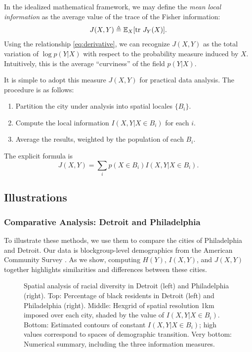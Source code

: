 \documentclass[english]{scrartcl}
\begin{document}
		In the idealized mathematical framework, we may define the \emph{mean local information} as the average value of the trace of the Fisher information: 
		\begin{equation}
			J(X,Y) \triangleq \mathbb{E}_X[\text{tr } J_Y(X)].
		\end{equation}
		Using the relationship \eqref{eq:derivative}, we can recognize $J(X,Y)$ as the total variation of $\log p(Y|X)$ with respect to the probability measure induced by $X$. Intuitively, this is the average ``curviness'' of the field $p(Y|X)$. 

		It is simple to adopt this measure $J(X,Y)$ for practical data analysis. The procedure is as follows: 
		\begin{enumerate}
		 	\item Partition the city under analysis into spatial locales $\{B_i\}$.
		 	\item Compute the local information $I(X,Y|X \in B_i)$ for each $i$. 
		 	\item Average the results, weighted by the population of each $B_i$. 
		\end{enumerate} 
		The explicit formula is 
		\begin{equation}
			J(X,Y) = \sum_i p(X \in B_i) I(X,Y|X \in B_i). \label{eq:formula}
		\end{equation}

	\subsection{Illustrations}
		\subsubsection{Comparative Analysis: Detroit and Philadelphia}
			To illustrate these methods, we use them to compare the cities of Philadelphia and Detroit. Our data is blockgroup-level demographics from the American Community Survey \cite{CensusRace}. As we show, computing $H(Y)$, $I(X,Y)$, and $J(X,Y)$ together highlights similarities and differences between these cities. 
			\begin{figure}
				\caption{Spatial analysis of racial diversity in Detroit (left) and Philadelphia (right). Top: Percentage of black residents in Detroit (left) and Philadelphia (right). Middle: Hexgrid of spatial resolution 1km imposed over each city, shaded by the value of $I(X,Y | X \in B_i)$. Bottom: Estimated contours of constant $I(X,Y | X \in B_i)$; high values correspond to spaces of demographic transition. Very bottom: Numerical summary, including the three information measures.} \label{fig:detroit_philly}
			\end{figure}
\end{document}
